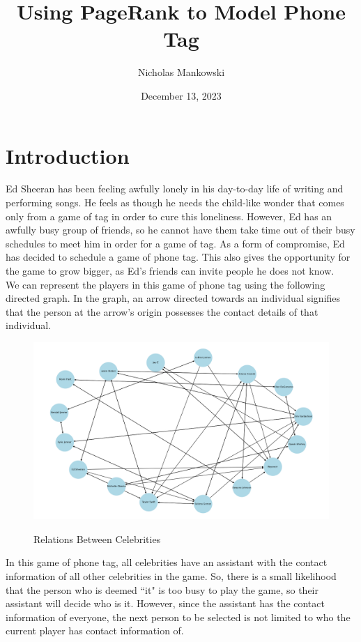 \documentclass[11pt]{article}
\title{Using PageRank to Model Phone Tag}
\author{Nicholas Mankowski}
\date{December 13, 2023}
\begin{document}
\maketitle

\section{Introduction}
      Ed Sheeran has been feeling awfully lonely in his day-to-day life of writing and performing songs.  
      He feels as though he needs the child-like wonder that comes only from a game of tag in order to cure this loneliness.
      However, Ed has an awfully busy group of friends, so he cannot have them take time out of their busy schedules to meet him in order for a game of tag.
      As a form of compromise, Ed has decided to schedule a game of phone tag.
      This also gives the opportunity for the game to grow bigger, as Ed's friends can invite people he does not know.
      \\

      We can represent the players in this game of phone tag using the following directed graph.  
      In the graph, an arrow directed towards an individual signifies that the person at the arrow's origin possesses the contact details of that individual.
      \begin{figure}[H]
        \centering
        \caption{Relations Between Celebrities}
        \includegraphics*[width=0.8\columnwidth]{models/graph.png}
        \label{relations-between-celebrities}
      \end{figure}

      In this game of phone tag, all celebrities have an assistant with the contact information of all other celebrities in the game.
      So, there is a small likelihood that the person who is deemed ``it" is too busy to play the game, so their assistant will decide who is it.
      However, since the assistant has the contact information of everyone, the next person to be selected is not limited to who the current player has contact information of.
      \\
\end{document}
